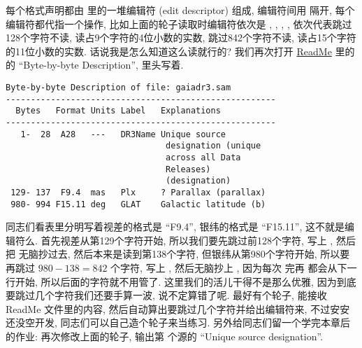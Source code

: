 每个格式声明都由 \ttt{()} 里的一堆编辑符 (edit descriptor) 组成, 编辑符间用 \ttt{,} 隔开, 每个编辑符都代指一个操作, 比如上面的轮子读取时编辑符依次是 , , , , 依次代表跳过128个字符不读, 读占9个字符的4位小数的实数, 跳过842个字符不读, 读占15个字符的11位小数的实数. 话说我是怎么知道这么读就行的? 我们再次打开 \href{https://cdsarc.cds.unistra.fr/viz-bin/ReadMe/I/355?format=html&tex=true}{ReadMe} 里的  的 ``Byte-by-byte Description'', 里头写着. 
\begin{lstlisting}
Byte-by-byte Description of file: gaiadr3.sam 
------------------------------------------------------
  Bytes   Format Units Label   Explanations
------------------------------------------------------
   1-  28  A28   ---   DR3Name Unique source
                                designation (unique
                                across all Data
                                Releases)
                                (designation)
 129- 137  F9.4  mas   Plx     ? Parallax (parallax)
 980- 994 F15.11 deg   GLAT    Galactic latitude (b)
\end{lstlisting}
同志们看表里分明写着视差的格式是 ``F9.4'', 银纬的格式是 ``F15.11'', 这不就是编辑符么. 首先视差从第129个字符开始, 所以我们要先跳过前128个字符, 写上 , 然后把  无脑抄过去, 然后本来是读到第138个字符, 但银纬从第980个字符开始, 所以要再跳过 $ 980-138=842 $ 个字符, 写上 , 然后无脑抄上 , 因为每次  完再  都会从下一行开始, 所以后面的字符就不用管了. 这里我们的活儿干得不是那么优雅, 因为到底要跳过几个字符我们还要手算一波, 说不定算错了呢. 最好有个轮子, 能接收 ReadMe 文件里的内容, 然后自动算出要跳过几个字符并给出编辑符来, 不过安安还没空开发, 同志们可以自己造个轮子来当练习. 另外给同志们留一个学完本章后的作业: 再次修改上面的轮子, 输出第  个源的 ``Unique source designation''. 

